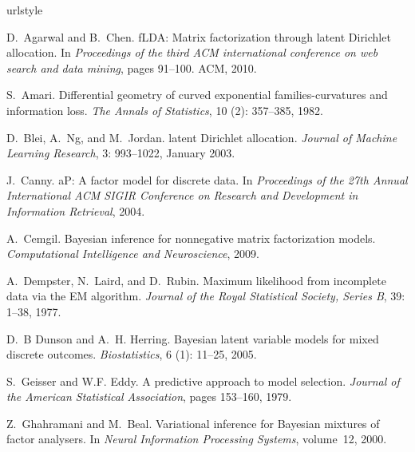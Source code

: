 \documentclass{article}
\begin{document}
\small{

\begin{thebibliography}{25}
\providecommand{\natexlab}[1]{#1}
\providecommand{\url}[1]{\texttt{#1}}
\expandafter\ifx\csname urlstyle\endcsname\relax
  \providecommand{\doi}[1]{doi: #1}\else
  \providecommand{\doi}{doi: \begingroup \urlstyle{rm}\Url}\fi

D.~Agarwal and B.~Chen.
\newblock f{LDA}: Matrix factorization through latent {D}irichlet allocation.
\newblock In \emph{Proceedings of the third ACM international conference on web
  search and data mining}, pages 91--100. ACM, 2010.

S.~Amari.
\newblock Differential geometry of curved exponential families-curvatures and
  information loss.
\newblock \emph{The Annals of Statistics}, 10 (2): 357--385,
  1982.

D.~Blei, A.~Ng, and M.~Jordan.
\newblock latent {D}irichlet allocation.
\newblock \emph{Journal of Machine Learning Research}, 3: 993--1022,
  January 2003.

J.~Canny.
a{P}: {A} factor model for discrete data.
\newblock In \emph{Proceedings of the 27th Annual International ACM SIGIR
  Conference on Research and Development in Information Retrieval}, 2004.

A.~Cemgil.
\newblock Bayesian inference for nonnegative matrix factorization models.
\newblock \emph{Computational Intelligence and Neuroscience}, 2009.

A.~Dempster, N.~Laird, and D.~Rubin.
\newblock Maximum likelihood from incomplete data via the {EM} algorithm.
\newblock \emph{Journal of the Royal Statistical Society, Series B},
  39: 1--38, 1977.

D.~B Dunson and A.~H. Herring.
\newblock Bayesian latent variable models for mixed discrete outcomes.
\newblock \emph{Biostatistics}, 6 (1): 11--25, 2005.

S.~Geisser and W.F. Eddy.
\newblock A predictive approach to model selection.
\newblock \emph{Journal of the American Statistical Association}, pages
  153--160, 1979.

Z.~Ghahramani and M.~Beal.
\newblock Variational inference for {B}ayesian mixtures of factor analysers.
\newblock In \emph{Neural Information Processing Systems}, volume~12, 2000.


\end{thebibliography}}
\end{document}

